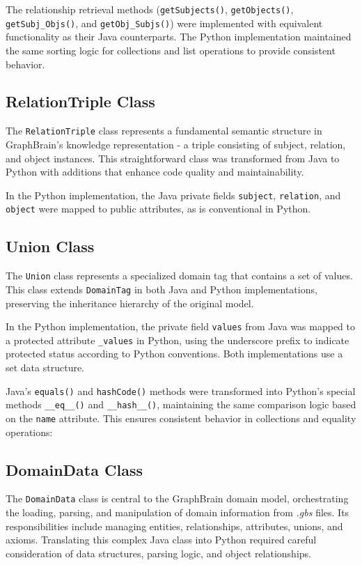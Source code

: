 \documentclass[12pt,a4paper]{article}
\begin{document}
The relationship retrieval methods (\texttt{getSubjects()}, \texttt{getObjects()}, \texttt{getSubj\_Objs()}, and \texttt{getObj\_Subjs()}) were implemented with equivalent functionality as their Java counterparts. The Python implementation maintained the same sorting logic for collections and list operations to provide consistent behavior.


\subsection{RelationTriple Class}
The \texttt{RelationTriple} class represents a fundamental semantic structure in GraphBrain's knowledge representation - a triple consisting of subject, relation, and object instances. This straightforward class was transformed from Java to Python with additions that enhance code quality and maintainability.

In the Python implementation, the Java private fields \texttt{subject}, \texttt{relation}, and \texttt{object} were mapped to public attributes, as is conventional in Python. 


\subsection{Union Class}
The \texttt{Union} class represents a specialized domain tag that contains a set of values. This class extends \texttt{DomainTag} in both Java and Python implementations, preserving the inheritance hierarchy of the original model.

In the Python implementation, the private field \texttt{values} from Java was mapped to a protected attribute \texttt{\_values} in Python, using the underscore prefix to indicate protected status according to Python conventions. Both implementations use a set data structure.

Java's \texttt{equals()} and \texttt{hashCode()} methods were transformed into Python's special methods \texttt{\_\_eq\_\_()} and \texttt{\_\_hash\_\_()}, maintaining the same comparison logic based on the \texttt{name} attribute. This ensures consistent behavior in collections and equality operations:



\subsection{DomainData Class}
The \texttt{DomainData} class is central to the GraphBrain domain model, orchestrating the loading, parsing, and manipulation of domain information from \textit{.gbs} files. Its responsibilities include managing entities, relationships, attributes, unions, and axioms. Translating this complex Java class into Python required careful consideration of data structures, parsing logic, and object relationships.
\end{document}
